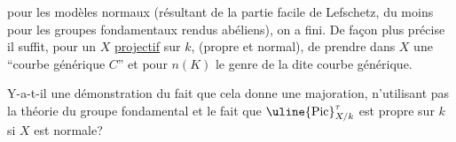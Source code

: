 pour les modèles normaux (résultant de
la partie facile de Lefschetz, du moins pour
les groupes fondamentaux rendus abéliens),
on a fini. De façon plus précise
il suffit, pour un  $X$ \uline{projectif} sur $k$,
(propre et normal), de prendre dans $X$
une ``courbe générique $C$'' et pour
$n(K)$ le genre de la dite courbe
générique.


Y-a-t-il une démonstration du fait
que cela donne une majoration, n'utilisant
pas la théorie du groupe fondamental
et le fait que $\uline{\mathrm{Pic}}^\tau_{X/k}$ est propre sur $k$
si $X$ est normale?
